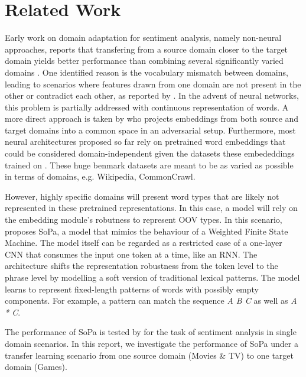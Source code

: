 \documentclass[11pt,a4paper]{article}
\begin{document}


\section{Related Work}

Early work on domain adaptation for sentiment analysis, namely non-neural approaches, reports that transfering from a source domain closer to the target domain yields better performance than combining several significantly varied domains \cite{blitzer2007biographies,aue2005customizing}.
One identified reason is the vocabulary mismatch between domains, leading to scenarios where features drawn from one domain are not present in the other or contradict each other, as reported by \citet{blitzer2007biographies}.
In the advent of neural networks, this problem is partially addressed with continuous representation of words. A more direct approach is taken by \citet{barnes2018projecting} who projects embeddings from both source and target domains into a common space in an adversarial setup.
Furthermore, most neural architectures proposed so far rely on pretrained word embeddings that could be considered domain-independent given the datasets these embededdings trained on \cite{pennington2014glove,Peters:2018}. These huge benmark datasets are meant to be as varied as possible in terms of domains, e.g. Wikipedia, CommonCrawl.

However, highly specific domains will present word types that are likely not represented in these pretrained representations. In this case, a model will rely on the embedding module's robutness to represent OOV types. In this scenario, \cite{schwartz2018sopa} proposes {\sc SoPa}, a model that mimics the behaviour of a Weighted Finite State Machine. The model itself can be regarded as a restricted case of a one-layer CNN that consumes the input one token at a time, like an RNN. The architecture shifts the representation robustness from the token level to the phrase level by modelling a soft version of traditional lexical patterns. The model learns to represent fixed-length patterns of words with possibly empty components. For example, a pattern can match  the sequence {\it A B C} as well as {\it A * C}.

The performance of {\sc SoPa} is tested by \citet{schwartz2018sopa} for the task of sentiment analysis in single domain scenarios. In this report, we investigate the performance of  {\sc SoPa} under a transfer learning scenario from one source domain (Movies \& TV) to one target domain (Games).
\end{document}
